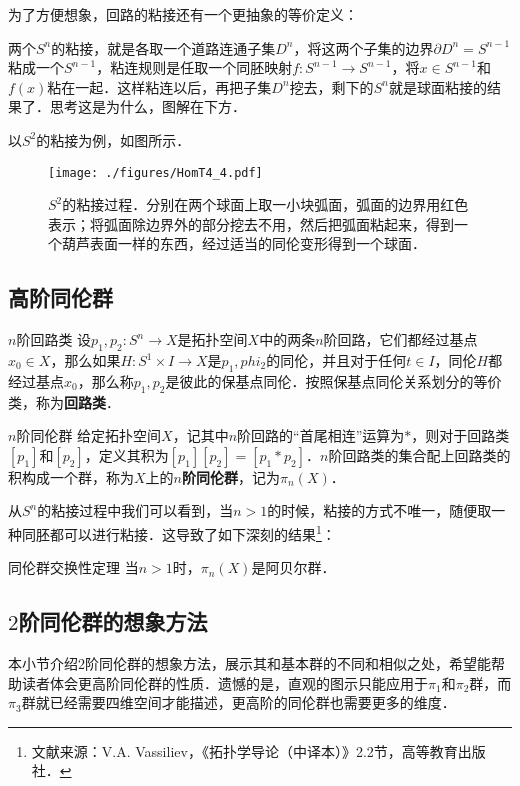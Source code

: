 为了方便想象，回路的粘接还有一个更抽象的等价定义：

\begin{exercise}{}
两个$S^n$的粘接，就是各取一个道路连通子集$D^n$，将这两个子集的边界$\partial D^n=S^{n-1}$粘成一个$S^{n-1}$，粘连规则是任取一个同胚映射$f:S^{n-1}\rightarrow S^{n-1}$，将$x\in S^{n-1}$和$f(x)$粘在一起．这样粘连以后，再把子集$D^n$挖去，剩下的$S^n$就是球面粘接的结果了．思考这是为什么，图解在下方．
\end{exercise}

以$S^2$的粘接为例，如图所示．

\begin{figure}[ht]
\centering
\texttt{[image: ./figures/HomT4\_4.pdf]}
\caption{$S^2$的粘接过程．分别在两个球面上取一小块弧面，弧面的边界用红色表示；将弧面除边界外的部分挖去不用，然后把弧面粘起来，得到一个葫芦表面一样的东西，经过适当的同伦变形得到一个球面．} \label{HomT4_fig4}
\end{figure}

\subsection{高阶同伦群}

\begin{definition}{$n$阶回路类}
设$p_1, p_2:S^n\rightarrow X$是拓扑空间$X$中的两条$n$阶回路，它们都经过基点$x_0\in X$，那么如果$H:S^1\times I\rightarrow X$是$p_1, phi_2$的同伦，并且对于任何$t\in I$，同伦$H$都经过基点$x_0$，那么称$p_1, p_2$是彼此的保基点同伦．按照保基点同伦关系划分的等价类，称为\textbf{回路类}．
\end{definition}

\begin{definition}{$n$阶同伦群}
给定拓扑空间$X$，记其中$n$阶回路的“首尾相连”运算为$*$，则对于回路类$[p_1]$和$[p_2]$，定义其积为$[p_1][p_2]=[p_1*p_2]$．$n$阶回路类的集合配上回路类的积构成一个群，称为$X$上的$n$\textbf{阶同伦群}，记为$\pi_n(X)$．
\end{definition}

从$S^n$的粘接过程中我们可以看到，当$n>1$的时候，粘接的方式不唯一，随便取一种同胚都可以进行粘接．这导致了如下深刻的结果\footnote{文献来源：V.A. Vassiliev，《拓扑学导论（中译本）》2.2节，高等教育出版社．}：

\begin{theorem}{同伦群交换性定理}
当$n>1$时，$\pi_n(X)$是阿贝尔群．
\end{theorem}

\subsection{$2$阶同伦群的想象方法}

本小节介绍$2$阶同伦群的想象方法，展示其和基本群的不同和相似之处，希望能帮助读者体会更高阶同伦群的性质．遗憾的是，直观的图示只能应用于$\pi_1$和$\pi_2$群，而$\pi_3$群就已经需要四维空间才能描述，更高阶的同伦群也需要更多的维度．



